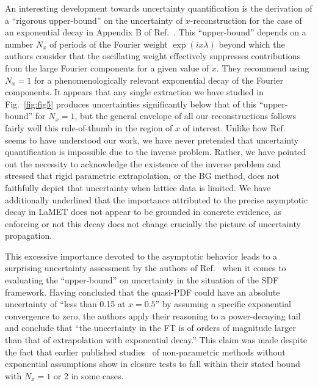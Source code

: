 \documentclass[aps,prl,groupedaddress,twocolumn,superscriptaddress,amsfonts,amssymb,amsmath,showpacs,floatfix,preprintnumbers]{revtex4-2}
\begin{document}
An interesting development towards uncertainty quantification is the derivation of a ``rigorous upper-bound'' on the uncertainty of $x$-reconstruction for the case of an exponential decay in Appendix B of Ref.~\cite{Gao:2021dbh}. This ``upper-bound'' depends on a number $N_x$ of periods of the Fourier weight $\exp(i x \lambda)$ beyond which the authors consider that the oscillating weight effectively suppresses contributions from the large Fourier components for a given value of $x$. They recommend using $N_x = 1$ for a phenomenologically relevant exponential decay of the Fourier components. It appears that any single extraction we have studied in Fig.~\ref{fig:fig5} produces uncertainties significantly below that of this ``upper-bound'' for $N_x = 1$, but the general envelope of all our reconstructions follows fairly well this rule-of-thumb in the region of $x$ of interest. Unlike how Ref.~\cite{Chen:2025cxr} seems to have understood our work, we have never pretended that uncertainty quantification is impossible due to the inverse problem. Rather, we have pointed out the necessity to acknowledge the existence of the inverse problem and stressed that rigid parametric extrapolation, or the BG method, does not faithfully depict that uncertainty when lattice data is limited. We have additionally underlined that the importance attributed to the precise asymptotic decay in LaMET does not appear to be grounded in concrete evidence, as enforcing or not this decay does not change crucially the picture of uncertainty propagation.

This excessive importance devoted to the asymptotic behavior leads to a surprising uncertainty assessment by the authors of Ref.~\cite{Gao:2021dbh} when it comes to evaluating the ``upper-bound'' on uncertainty in the situation of the SDF framework. Having concluded that the quasi-PDF could have an absolute uncertainty of ``less than 0.15 at $x = 0.5$'' by assuming a specific exponential convergence to zero, the authors apply their reasoning to a power-decaying tail and conclude that ``the uncertainty in the FT is of orders of magnitude larger than that of extrapolation with exponential decay.'' This claim was made despite the fact that earlier published studies~\cite{Karpie:2019eiq,Alexandrou:2020tqq} of non-parametric methods without exponential assumptions show in closure tests to fall within their stated bound with $N_x=1$ or 2 in some cases.
\end{document}
